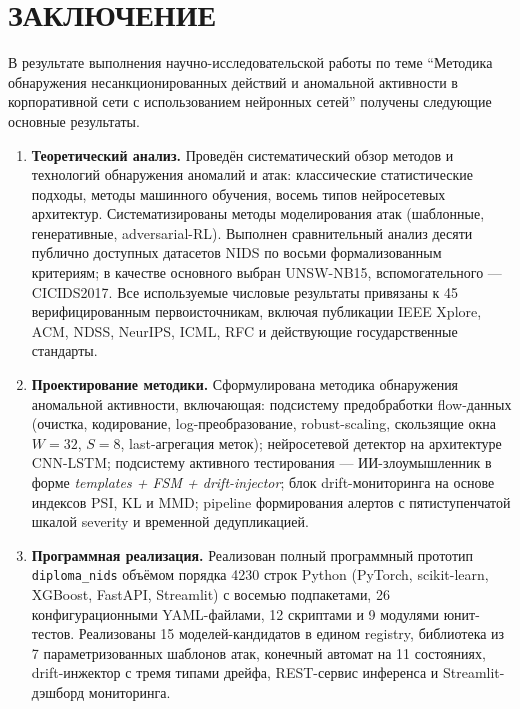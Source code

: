 \section*{ЗАКЛЮЧЕНИЕ}

В результате выполнения научно-исследовательской работы по теме
``Методика обнаружения несанкционированных действий и аномальной
активности в корпоративной сети с использованием нейронных сетей''
получены следующие основные результаты.

\begin{enumerate}
    \item \textbf{Теоретический анализ.} Проведён систематический
    обзор методов и технологий обнаружения аномалий и атак: классические
    статистические подходы, методы машинного обучения, восемь типов
    нейросетевых архитектур. Систематизированы методы моделирования
    атак (шаблонные, генеративные, adversarial-RL). Выполнен
    сравнительный анализ десяти публично доступных датасетов NIDS по
    восьми формализованным критериям; в качестве основного выбран
    UNSW-NB15, вспомогательного --- CICIDS2017. Все используемые
    числовые результаты привязаны к 45 верифицированным первоисточникам,
    включая публикации IEEE Xplore, ACM, NDSS, NeurIPS, ICML, RFC и
    действующие государственные стандарты.

    \item \textbf{Проектирование методики.} Сформулирована методика
    обнаружения аномальной активности, включающая: подсистему
    предобработки flow-данных (очистка, кодирование, log-преобразование,
    robust-scaling, скользящие окна $W = 32$, $S = 8$, last-агрегация
    меток); нейросетевой детектор на архитектуре CNN-LSTM;
    подсистему активного тестирования --- ИИ-злоумышленник в форме
    \emph{templates + FSM + drift-injector}; блок drift-мониторинга
    на основе индексов PSI, KL и MMD; pipeline формирования алертов с
    пятиступенчатой шкалой severity и временной дедупликацией.

    \item \textbf{Программная реализация.} Реализован полный
    программный прототип \texttt{diploma\_nids} объёмом порядка
    4230 строк Python (PyTorch, scikit-learn, XGBoost, FastAPI,
    Streamlit) с восемью подпакетами, 26 конфигурационными
    YAML-файлами, 12 скриптами и 9 модулями юнит-тестов.
    Реализованы 15 моделей-кандидатов в едином registry, библиотека
    из 7 параметризованных шаблонов атак, конечный автомат на 11
    состояниях, drift-инжектор с тремя типами дрейфа, REST-сервис
    инференса и Streamlit-дэшборд мониторинга.


\end{enumerate}
